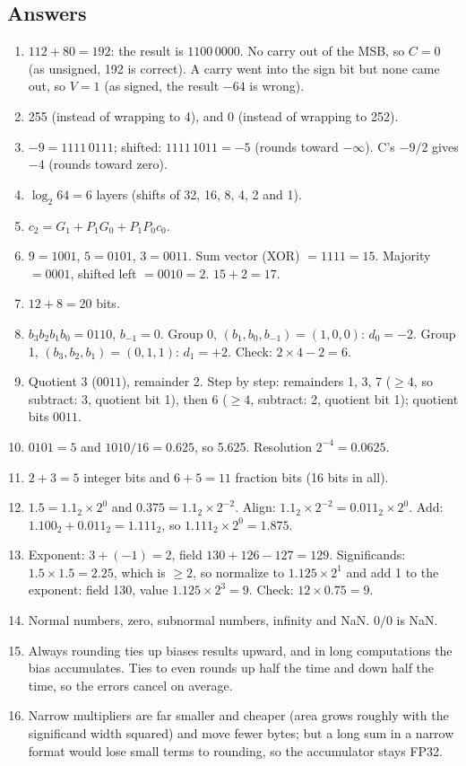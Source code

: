 \subsection*{Answers}
\begin{enumerate}
  \item $112 + 80 = 192$: the result is $1100\,0000$. No carry out of the MSB, so $C = 0$ (as unsigned, 192 is correct). A carry went into the sign bit but none came out, so $V = 1$ (as signed, the result $-64$ is wrong).
  \item 255 (instead of wrapping to 4), and 0 (instead of wrapping to 252).
  \item $-9 = 1111\,0111$; shifted: $1111\,1011 = -5$ (rounds toward $-\infty$). C's $-9/2$ gives $-4$ (rounds toward zero).
  \item $\log_2 64 = 6$ layers (shifts of 32, 16, 8, 4, 2 and 1).
  \item $c_2 = G_1 + P_1 G_0 + P_1 P_0 c_0$.
  \item $9 = 1001$, $5 = 0101$, $3 = 0011$. Sum vector (XOR) $= 1111 = 15$. Majority $= 0001$, shifted left $= 0010 = 2$. $15 + 2 = 17$.
  \item $12 + 8 = 20$ bits.
  \item $b_3 b_2 b_1 b_0 = 0110$, $b_{-1} = 0$. Group 0, $(b_1, b_0, b_{-1}) = (1, 0, 0)$: $d_0 = -2$. Group 1, $(b_3, b_2, b_1) = (0, 1, 1)$: $d_1 = +2$. Check: $2 \times 4 - 2 = 6$.
  \item Quotient 3 ($0011$), remainder 2. Step by step: remainders 1, 3, 7 ($\ge 4$, so subtract: 3, quotient bit 1), then 6 ($\ge 4$, subtract: 2, quotient bit 1); quotient bits $0011$.
  \item $0101 = 5$ and $1010/16 = 0.625$, so 5.625. Resolution $2^{-4} = 0.0625$.
  \item $2 + 3 = 5$ integer bits and $6 + 5 = 11$ fraction bits (16 bits in all).
  \item $1.5 = 1.1_2 \times 2^0$ and $0.375 = 1.1_2 \times 2^{-2}$. Align: $1.1_2 \times 2^{-2} = 0.011_2 \times 2^0$. Add: $1.100_2 + 0.011_2 = 1.111_2$, so $1.111_2 \times 2^0 = 1.875$.
  \item Exponent: $3 + (-1) = 2$, field $130 + 126 - 127 = 129$. Significands: $1.5 \times 1.5 = 2.25$, which is $\ge 2$, so normalize to $1.125 \times 2^1$ and add 1 to the exponent: field 130, value $1.125 \times 2^3 = 9$. Check: $12 \times 0.75 = 9$.
  \item Normal numbers, zero, subnormal numbers, infinity and NaN. $0/0$ is NaN.
  \item Always rounding ties up biases results upward, and in long computations the bias accumulates. Ties to even rounds up half the time and down half the time, so the errors cancel on average.
  \item Narrow multipliers are far smaller and cheaper (area grows roughly with the significand width squared) and move fewer bytes; but a long sum in a narrow format would lose small terms to rounding, so the accumulator stays FP32.
\end{enumerate}
